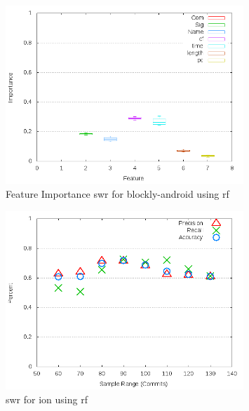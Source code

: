 \begin{figure}[!t]
\centering
\includegraphics[width=0.8\textwidth]{images/rf/test_1/blockly-android_importance.png}
\caption{Feature Importance \gls{swr} for blockly-android using \gls{rf}}
\label{fig:test_1_blockly-android_rf_importance}
\end{figure}

\begin{figure}[!t]
\centering
\includegraphics[width=0.8\textwidth]{images/rf/test_1/ion_sample_range.png}
\caption{\gls{swr} for ion using \gls{rf}}
\label{fig:test_1_ion_rf}
\end{figure}

